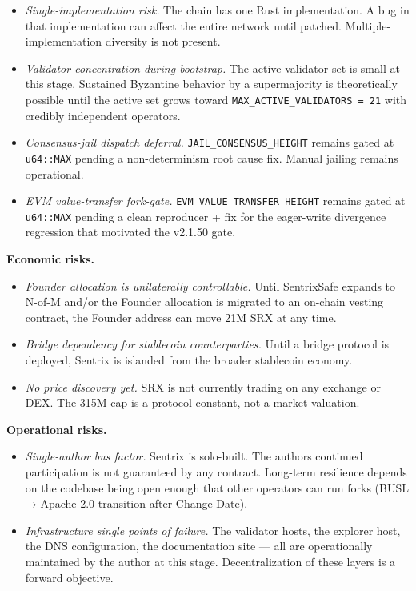 \documentclass[11pt,a4paper]{article}
\providecommand{\tightlist}{\setlength{\itemsep}{0pt}\setlength{\parskip}{0pt}}
\begin{document}
\begin{itemize}
\tightlist
\item
  \emph{Single-implementation risk.} The chain has one Rust
  implementation. A bug in that implementation can affect the entire
  network until patched. Multiple-implementation diversity is not
  present.
\item
  \emph{Validator concentration during bootstrap.} The active validator
  set is small at this stage. Sustained Byzantine behavior by a
  supermajority is theoretically possible until the active set grows
  toward \texttt{MAX\_ACTIVE\_VALIDATORS\ =\ 21} with credibly
  independent operators.
\item
  \emph{Consensus-jail dispatch deferral.}
  \texttt{JAIL\_CONSENSUS\_HEIGHT} remains gated at \texttt{u64::MAX}
  pending a non-determinism root cause fix. Manual jailing remains
  operational.
\item
  \emph{EVM value-transfer fork-gate.}
  \texttt{EVM\_VALUE\_TRANSFER\_HEIGHT} remains gated at
  \texttt{u64::MAX} pending a clean reproducer + fix for the eager-write
  divergence regression that motivated the v2.1.50 gate.
\end{itemize}

\textbf{Economic risks.}

\begin{itemize}
\tightlist
\item
  \emph{Founder allocation is unilaterally controllable.} Until
  SentrixSafe expands to N-of-M and/or the Founder allocation is
  migrated to an on-chain vesting contract, the Founder address can move
  21M SRX at any time.
\item
  \emph{Bridge dependency for stablecoin counterparties.} Until a bridge
  protocol is deployed, Sentrix is islanded from the broader stablecoin
  economy.
\item
  \emph{No price discovery yet.} SRX is not currently trading on any
  exchange or DEX. The 315M cap is a protocol constant, not a market
  valuation.
\end{itemize}

\textbf{Operational risks.}

\begin{itemize}
\tightlist
\item
  \emph{Single-author bus factor.} Sentrix is solo-built. The
  author\textquotesingle s continued participation is not guaranteed by
  any contract. Long-term resilience depends on the codebase being open
  enough that other operators can run forks (BUSL → Apache 2.0
  transition after Change Date).
\item
  \emph{Infrastructure single points of failure.} The validator hosts,
  the explorer host, the DNS configuration, the documentation site ---
  all are operationally maintained by the author at this stage.
  Decentralization of these layers is a forward objective.
\end{itemize}
\end{document}
